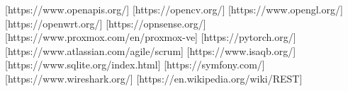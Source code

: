 \documentclass{cvhub}
\begin{document}
{{\begin{sortedBubbles}
        [https://www.openapis.org/]
        [https://opencv.org/]
        [https://www.opengl.org/]
        [https://openwrt.org/]
        [https://opnsense.org/]
        [https://www.proxmox.com/en/proxmox-ve]
        [https://pytorch.org/]
        [https://www.atlassian.com/agile/scrum]
        [https://www.isaqb.org/]
        [https://www.sqlite.org/index.html]
        [https://symfony.com/]
        [https://www.wireshark.org/]    
        [https://en.wikipedia.org/wiki/REST]
    \end{sortedBubbles}
}
}
\end{document}
